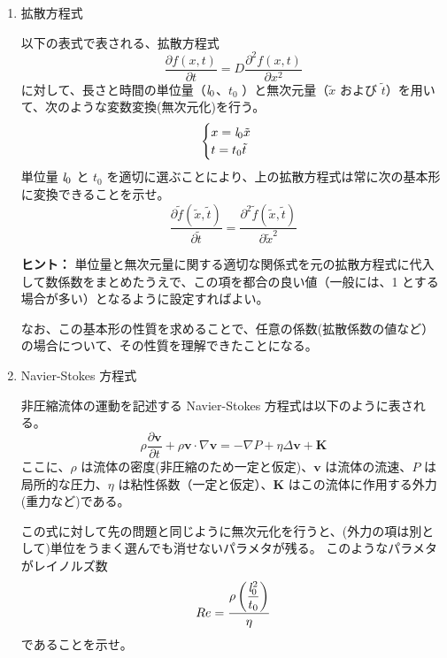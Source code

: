\documentclass[uplatex,dvipdfmx,a4paper,11pt]{jsarticle}
\newcommand{\difp}[2]{\dfrac{\partial #1}{\partial #2}}
\newcommand{\difpp}[2]{\dfrac{\partial^2 #1}{\partial #2^2}}
\begin{document}
\begin{enumerate}
\setlength{\parskip}{0cm} %
\setlength{\itemsep}{0.5cm} %
\item
拡散方程式

以下の表式で表される、拡散方程式
\begin{equation*}
\difp{f(x, t)}{t} = D \difpp{f(x, t)}{x}
\end{equation*}
に対して、長さと時間の単位量（${\it l}_0$、$t_0$ ）と無次元量（$\tilde{x}$ および $\tilde{t}$）を用いて、次のような変数変換(無次元化)を行う。
\begin{equation*}
\begin{cases}
x= {\it l}_0 \tilde{x} \\
t = t_0 \tilde{t}
\end{cases}
\end{equation*}
単位量 ${\it l}_0$ と $t_0$ を適切に選ぶことにより、上の拡散方程式は常に次の基本形に変換できることを示せ。
\begin{equation*}
\difp{\tilde{f}(\tilde{x}, \tilde{t})}{\tilde{t}} = \difpp{ \tilde{f}(\tilde{x}, \tilde{t})}{\tilde{x}}
\end{equation*}

\begin{itembox}[l]{{\bf ヒント：}}
単位量と無次元量に関する適切な関係式を元の拡散方程式に代入して数係数をまとめたうえで、この項を都合の良い値（一般には、1 とする場合が多い）となるように設定すればよい。

なお、この基本形の性質を求めることで、任意の係数(拡散係数の値など）の場合について、その性質を理解できたことになる。

\end{itembox}


\item
Navier-Stokes 方程式

非圧縮流体の運動を記述する Navier-Stokes 方程式は以下のように表される。
\begin{equation*}
\rho\dfrac{\partial \bm{v}}{\partial t} + \rho \bm{v} \cdot \nabla \bm{v} = - \nabla P + \eta \Delta \bm{v} + \bm{K}
\end{equation*}
ここに、$\rho$ は流体の密度(非圧縮のため一定と仮定)、$\bm{v}$ は流体の流速、$P$ は局所的な圧力、$\eta$ は粘性係数（一定と仮定）、$\bm{K}$ はこの流体に作用する外力(重力など)である。

この式に対して先の問題と同じように無次元化を行うと、(外力の項は別として)単位をうまく選んでも消せないパラメタが残る。
このようなパラメタがレイノルズ数
\begin{equation*}
Re = \dfrac{\rho \left(\dfrac{{\it l}_0^2}{t_0} \right)}{\eta}
\end{equation*}
であることを示せ。


\end{enumerate}
\end{document}
